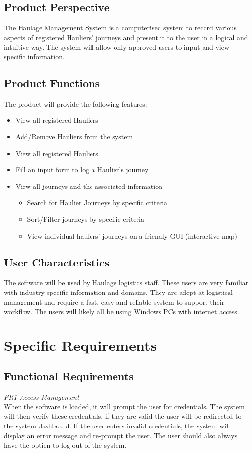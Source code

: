 \documentclass{project}
\begin{document}
\subsection{Product Perspective}
The Haulage Management System is a computerised system to record various aspects of registered Hauliers' journeys and present it to the user in a logical and intuitive way. The system will allow only approved users to input and view specific information.

\subsection{Product Functions}
The product will provide the following features:

\begin{itemize}
	\item View all registered Hauliers
	\item Add/Remove Hauliers from the system
	\item View all registered Hauliers
	\item Fill an input form to log a Haulier's journey
	\item View all journeys and the associated information
	\begin{itemize}
		\item Search for Haulier Journeys by specific criteria
		\item Sort/Filter journeys by specific criteria
		\item View individual haulers' journeys on a friendly GUI (interactive map)
	\end{itemize}
\end{itemize}

\subsection{User Characteristics}
The software will be used by Haulage logistics staff. These users are very familiar with industry specific information and domains. They are adept at logistical management and require a fast, easy and reliable system to support their workflow. The users will likely all be using Windows PCs with internet access.

\newpage

\section{Specific Requirements}

\subsection{Functional Requirements}
\textit{FR1 Access Management}\\
When the software is loaded, it will prompt the user for credentials. The system will then verify these credentials, if they are valid the user will be redirected to the system dashboard. If the user enters invalid credentials, the system will display an error message and re-prompt the user. The user should also always have the option to log-out of the system.\\
\end{document}
